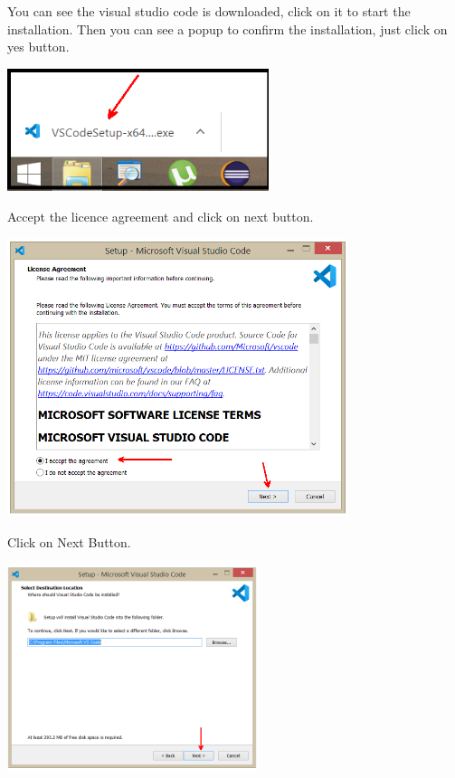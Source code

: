 \documentclass{article}
\begin{document}
\noindent You can see the visual studio code is downloaded, click on it to start the installation. Then you can see a popup to confirm the installation, just click on yes button.\\
   
 

\begin{center}
	\noindent \includegraphics*[width=3.01in, height=1.41in]{IMG-06-17}
\end{center}

\noindent 

\newpage
   Accept the licence agreement and click on next button.
 

\begin{center}
	\noindent \includegraphics*[width=3.93in, height=3.21in]{IMG-06-18}
\end{center}

\noindent Click on Next Button.
 

\begin{center}
	\noindent \includegraphics*[width=2.88in, height=2.38in]{IMG-06-19}
\end{center}
\end{document}
